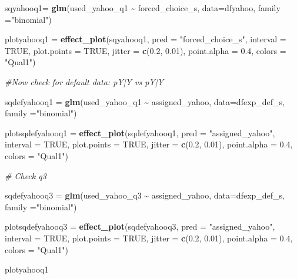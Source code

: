 \documentclass[
  11pt,
]{article}
\newenvironment{Shaded}{\begin{snugshade}}{\end{snugshade}}
\newcommand{\AttributeTok}[1]{\textcolor[rgb]{0.13,0.29,0.53}{#1}}
\newcommand{\CommentTok}[1]{\textcolor[rgb]{0.56,0.35,0.01}{\textit{#1}}}
\newcommand{\ConstantTok}[1]{\textcolor[rgb]{0.56,0.35,0.01}{#1}}
\newcommand{\FloatTok}[1]{\textcolor[rgb]{0.00,0.00,0.81}{#1}}
\newcommand{\FunctionTok}[1]{\textcolor[rgb]{0.13,0.29,0.53}{\textbf{#1}}}
\newcommand{\NormalTok}[1]{#1}
\newcommand{\OtherTok}[1]{\textcolor[rgb]{0.56,0.35,0.01}{#1}}
\newcommand{\SpecialCharTok}[1]{\textcolor[rgb]{0.81,0.36,0.00}{\textbf{#1}}}
\newcommand{\StringTok}[1]{\textcolor[rgb]{0.31,0.60,0.02}{#1}}
\begin{document}
\begin{Shaded}
\begin{Highlighting}[]
\NormalTok{sqyahooq1}\OtherTok{=} \FunctionTok{glm}\NormalTok{(used\_yahoo\_q1 }\SpecialCharTok{\textasciitilde{}}\NormalTok{ forced\_choice\_s, }\AttributeTok{data=}\NormalTok{dfyahoo, }\AttributeTok{family =}\StringTok{"binomial"}\NormalTok{)}


\NormalTok{plotyahooq1 }\OtherTok{=} \FunctionTok{effect\_plot}\NormalTok{(sqyahooq1, }\AttributeTok{pred =} \StringTok{"forced\_choice\_s"}\NormalTok{, }\AttributeTok{interval =} \ConstantTok{TRUE}\NormalTok{, }\AttributeTok{plot.points =} \ConstantTok{TRUE}\NormalTok{, }\AttributeTok{jitter =} \FunctionTok{c}\NormalTok{(}\FloatTok{0.2}\NormalTok{, }\FloatTok{0.01}\NormalTok{), }\AttributeTok{point.alpha =} \FloatTok{0.4}\NormalTok{, }\AttributeTok{colors =} \StringTok{"Qual1"}\NormalTok{)}


\CommentTok{\#Now check for default data: pY|Y vs pY|Y\textasciigrave{}}

\NormalTok{sqdefyahooq1 }\OtherTok{=} \FunctionTok{glm}\NormalTok{(used\_yahoo\_q1 }\SpecialCharTok{\textasciitilde{}}\NormalTok{ assigned\_yahoo, }\AttributeTok{data=}\NormalTok{dfexp\_def\_s, }\AttributeTok{family =}\StringTok{"binomial"}\NormalTok{)}

\NormalTok{plotsqdefyahooq1 }\OtherTok{=} \FunctionTok{effect\_plot}\NormalTok{(sqdefyahooq1, }\AttributeTok{pred =} \StringTok{"assigned\_yahoo"}\NormalTok{, }\AttributeTok{interval =} \ConstantTok{TRUE}\NormalTok{, }\AttributeTok{plot.points =} \ConstantTok{TRUE}\NormalTok{, }\AttributeTok{jitter =} \FunctionTok{c}\NormalTok{(}\FloatTok{0.2}\NormalTok{, }\FloatTok{0.01}\NormalTok{), }\AttributeTok{point.alpha =} \FloatTok{0.4}\NormalTok{, }\AttributeTok{colors =} \StringTok{"Qual1"}\NormalTok{)}

\CommentTok{\# Check q3}

\NormalTok{sqdefyahooq3 }\OtherTok{=} \FunctionTok{glm}\NormalTok{(used\_yahoo\_q3 }\SpecialCharTok{\textasciitilde{}}\NormalTok{ assigned\_yahoo, }\AttributeTok{data=}\NormalTok{dfexp\_def\_s, }\AttributeTok{family =}\StringTok{"binomial"}\NormalTok{)}

\NormalTok{plotsqdefyahooq3 }\OtherTok{=} \FunctionTok{effect\_plot}\NormalTok{(sqdefyahooq3, }\AttributeTok{pred =} \StringTok{"assigned\_yahoo"}\NormalTok{, }\AttributeTok{interval =} \ConstantTok{TRUE}\NormalTok{, }\AttributeTok{plot.points =} \ConstantTok{TRUE}\NormalTok{, }\AttributeTok{jitter =} \FunctionTok{c}\NormalTok{(}\FloatTok{0.2}\NormalTok{, }\FloatTok{0.01}\NormalTok{), }\AttributeTok{point.alpha =} \FloatTok{0.4}\NormalTok{, }\AttributeTok{colors =} \StringTok{"Qual1"}\NormalTok{)}

\NormalTok{plotyahooq1}
\end{Highlighting}
\end{Shaded}
\end{document}
